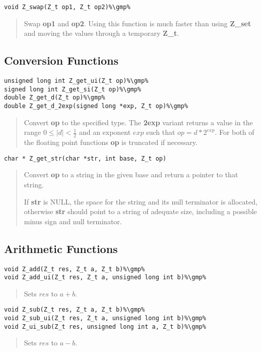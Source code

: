 \documentclass[a4paper,10pt]{article}
\newcommand{\gmp}{\hfill[GMP]}
\begin{document}
\begin{lstlisting}
void Z_swap(Z_t op1, Z_t op2)%\gmp%
\end{lstlisting}
\begin{quote}Swap \textbf{op1} and \textbf{op2}. Using this function is much faster than using \textbf{Z\_set} and moving the values through a temporary \textbf{Z\_t}.\end{quote}

\subsection{Conversion Functions}
\begin{lstlisting}
unsigned long int Z_get_ui(Z_t op)%\gmp%
signed long int Z_get_si(Z_t op)%\gmp%
double Z_get_d(Z_t op)%\gmp%
double Z_get_d_2exp(signed long *exp, Z_t op)%\gmp%
\end{lstlisting}
\begin{quote}Convert \textbf{op} to the specified type. The \textbf{2exp} variant returns a value in the range $0 \le |d| < \frac{1}{2}$ and an exponent $exp$ such that $op = d*2^{exp}$. For both of the floating point functions \textbf{op} is truncated if necessary.\end{quote}

\begin{lstlisting}
char * Z_get_str(char *str, int base, Z_t op)
\end{lstlisting}
\begin{quote}Convert \textbf{op} to a string in the given base and return a pointer to that string. 

If \textbf{str} is NULL, the space for the string and its null terminator is allocated, otherwise \textbf{str} should point to a string of adequate size, including a possible minus sign and null terminator.\end{quote}

\subsection{Arithmetic Functions}
\begin{lstlisting}
void Z_add(Z_t res, Z_t a, Z_t b)%\gmp%
void Z_add_ui(Z_t res, Z_t a, unsigned long int b)%\gmp%
\end{lstlisting}
\begin{quote}Sets $res$ to $a + b$.\end{quote}

\begin{lstlisting}
void Z_sub(Z_t res, Z_t a, Z_t b)%\gmp%
void Z_sub_ui(Z_t res, Z_t a, unsigned long int b)%\gmp%
void Z_ui_sub(Z_t res, unsigned long int a, Z_t b)%\gmp%
\end{lstlisting}
\begin{quote}Sets $res$ to $a - b$.\end{quote} 
\end{document}
